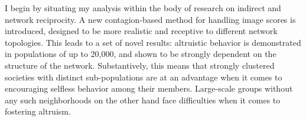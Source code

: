 \documentclass[12pt]{article}
\begin{document}

I begin by situating my analysis within the body of research on indirect and network reciprocity. A new contagion-based method for handling image scores is introduced, designed to be more realistic and receptive to different network topologies. This leads to a set of novel results: altruistic behavior is demonstrated in populations of up to 20,000, and shown to be strongly dependent on the structure of the network. Substantively, this means that strongly clustered societies with distinct sub-populations are at an advantage when it comes to encouraging selfless behavior among their members. Large-scale groups without any such neighborhoods on the other hand face difficulties when it comes to fostering altruism.
\end{document}
